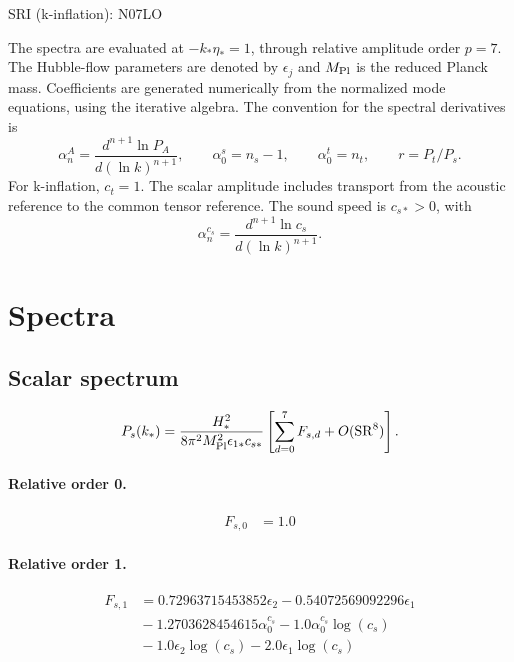 \documentclass[10pt]{article}
\begin{document}
\begin{center}\Large SRI (k-inflation): N07LO\end{center}
The spectra are evaluated at $-k_*\eta_*=1$, through relative amplitude
order $p=7$. The Hubble-flow parameters are denoted by $\epsilon_j$
and $M_{\rm Pl}$ is the reduced Planck mass. Coefficients are generated
numerically from the normalized mode equations, using the iterative algebra.
The convention for the spectral derivatives is
\[
\alpha_n^A=\frac{d^{n+1}\ln P_A}{d(\ln k)^{n+1}},\qquad
\alpha_0^s=n_s-1,\qquad\alpha_0^t=n_t,\qquad r=P_t/P_s.
\]
For k-inflation, $c_t=1$. The scalar amplitude includes transport from the acoustic reference to the common tensor reference. The sound speed is $c_{s*}>0$, with
\[\alpha_n^{c_s}=\frac{d^{n+1}\ln c_s}{d(\ln k)^{n+1}}.\]
\section{Spectra}

\subsection{Scalar spectrum}
\[P_s(k_*)=\frac{H_*^2}{8\pi^2M_{\rm Pl}^2\epsilon_{1*}c_{s*}}\left[\sum_{d=0}^{7}F_{s,d}+O(\mathrm{SR}^{8})\right].\]
\paragraph{Relative order 0.}
\begin{align*}
F_{s,0} &= 1.0
\end{align*}

\paragraph{Relative order 1.}
\begin{align*}
F_{s,1} &= 0.72963715453852 \epsilon_{2} - 0.54072569092296 \epsilon_{1} \\
&{}  - 1.2703628454615 \alpha_{0}^{c_s} - 1.0 \alpha_{0}^{c_s} \log{\left(c_{s} \right)} \\
&{}  - 1.0 \epsilon_{2} \log{\left(c_{s} \right)} - 2.0 \epsilon_{1} \log{\left(c_{s} \right)}
\end{align*}
\end{document}
